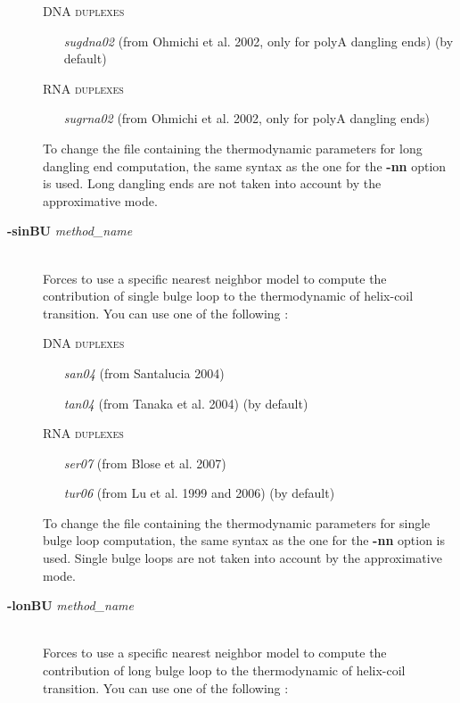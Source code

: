 \documentclass{article}
\begin{document}
\begin{description}
  \textsc{DNA duplexes}
    \begin{itemize}
    \item [\textit{sugdna02}] (from Ohmichi et al. 2002, only for polyA dangling ends) (by default)     
    \end{itemize}
  \textsc{RNA duplexes}
    \begin{itemize}
    \item [\textit{sugrna02}] (from Ohmichi et al. 2002, only for polyA dangling ends)
    \end{itemize}
  To change the file containing the thermodynamic parameters for long dangling end computation, the same syntax as the one for the \textbf{-nn} option is used.
  Long dangling ends are not taken into account by the approximative mode.  
\item [\textbf{-sinBU} \textit{method\_name}]\mbox{}\\ 
  Forces to use a specific nearest neighbor model to compute the contribution of single bulge loop to the thermodynamic of helix-coil transition. 
  You can use one of the following :
  
  \textsc{DNA duplexes}
    \begin{itemize}
    \item [\textit{san04}] (from Santalucia 2004) 
    \item [\textit{tan04}] (from Tanaka et al. 2004)  (by default) 	    
    \end{itemize}
  \textsc{RNA duplexes}
    \begin{itemize}
    \item [\textit{ser07}] (from Blose et al. 2007)
    \item [\textit{tur06}] (from Lu et al. 1999 and 2006)  (by default) 			 			 
    \end{itemize}
  To change the file containing the thermodynamic parameters for single bulge loop computation, the same syntax as the one for the \textbf{-nn} option is used.
  Single bulge loops are not taken into account by the approximative mode. 
\item [\textbf{-lonBU} \textit{method\_name}]\mbox{}\\ 
  Forces to use a specific nearest neighbor model to compute the contribution of long bulge loop to the thermodynamic of helix-coil transition. 
  You can use one of the following :
  

\end{description}
\end{document}
